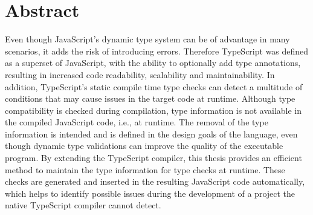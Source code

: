 \chapter{Abstract}


Even though JavaScript's dynamic type system can be of advantage in many scenarios, it adds the risk of introducing errors. Therefore TypeScript was defined as a superset of JavaScript, with the ability to optionally add type annotations, resulting in increased code readability, scalability and maintainability. In addition, TypeScript's static compile time type checks can detect a multitude of conditions that may cause issues in the target code at runtime. Although type compatibility is checked during compilation, type information is not available in the compiled JavaScript code, i.e., at runtime. The removal of the type information is intended and is defined in the design goals of the language, even though dynamic type validations can improve the quality of the executable program. By extending the TypeScript compiler, this thesis provides an efficient method to maintain the type information for type checks at runtime. These checks are generated and inserted in the resulting JavaScript code automatically, which helps to identify possible issues during the development of a project the native TypeScript compiler cannot detect.
